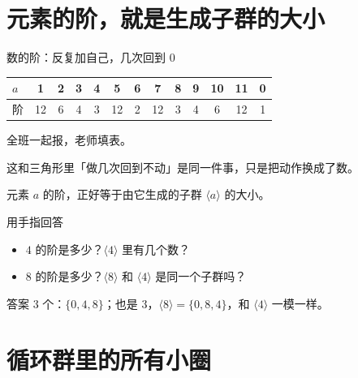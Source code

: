 \documentclass[10pt]{beamer}
\begin{document}
\section{元素的阶，就是生成子群的大小}

\begin{frame}{数的阶：反复加自己，几次回到 0}
  \begin{center}
  \begin{tabular}{@{}l*{12}{c}@{}}
    \toprule
    \(a\) & 1 & 2 & 3 & 4 & 5 & 6 & 7 & 8 & 9 & 10 & 11 & 0 \\
    \midrule
    阶 & 12 & 6 & 4 & 3 & 12 & 2 & 12 & 3 & 4 & 6 & 12 & 1 \\
    \bottomrule
  \end{tabular}
  \end{center}
  \pause
  \begin{center}
    {\large 全班一起报，老师填表。}
  \end{center}
  \pause
  \begin{center}
    {\large 这和三角形里「做几次回到不动」是同一件事，只是把动作换成了数。}
  \end{center}
  \pause
  \begin{theorem}[阶与生成子群]
    元素 \(a\) 的阶，正好等于由它生成的子群 \(\langle a\rangle\) 的大小。
  \end{theorem}
\end{frame}

\begin{frame}{用手指回答}
  \begin{itemize}
    \item \(4\) 的阶是多少？\(\langle 4\rangle\) 里有几个数？
    \item \(8\) 的阶是多少？\(\langle 8\rangle\) 和 \(\langle 4\rangle\) 是同一个子群吗？
  \end{itemize}
  \pause
  \begin{block}{答案}
    \(3\) 个：\(\{0,4,8\}\)；\quad 也是 \(3\)，\(\langle 8\rangle=\{0,8,4\}\)，和 \(\langle 4\rangle\) 一模一样。
  \end{block}
\end{frame}

\section{循环群里的所有小圈}
\end{document}
